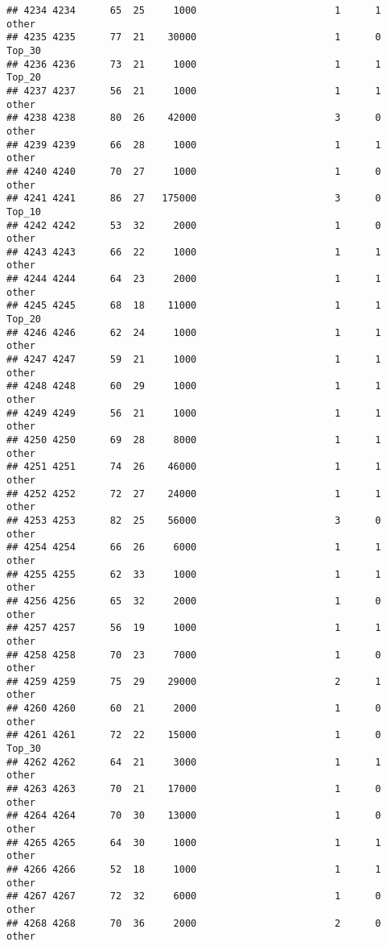 \documentclass[
]{article}
\begin{document}
\begin{verbatim}
## 4234 4234      65  25     1000                        1      1    other
## 4235 4235      77  21    30000                        1      0   Top_30
## 4236 4236      73  21     1000                        1      1   Top_20
## 4237 4237      56  21     1000                        1      1    other
## 4238 4238      80  26    42000                        3      0    other
## 4239 4239      66  28     1000                        1      1    other
## 4240 4240      70  27     1000                        1      0    other
## 4241 4241      86  27   175000                        3      0   Top_10
## 4242 4242      53  32     2000                        1      0    other
## 4243 4243      66  22     1000                        1      1    other
## 4244 4244      64  23     2000                        1      1    other
## 4245 4245      68  18    11000                        1      1   Top_20
## 4246 4246      62  24     1000                        1      1    other
## 4247 4247      59  21     1000                        1      1    other
## 4248 4248      60  29     1000                        1      1    other
## 4249 4249      56  21     1000                        1      1    other
## 4250 4250      69  28     8000                        1      1    other
## 4251 4251      74  26    46000                        1      1    other
## 4252 4252      72  27    24000                        1      1    other
## 4253 4253      82  25    56000                        3      0    other
## 4254 4254      66  26     6000                        1      1    other
## 4255 4255      62  33     1000                        1      1    other
## 4256 4256      65  32     2000                        1      0    other
## 4257 4257      56  19     1000                        1      1    other
## 4258 4258      70  23     7000                        1      0    other
## 4259 4259      75  29    29000                        2      1    other
## 4260 4260      60  21     2000                        1      0    other
## 4261 4261      72  22    15000                        1      0   Top_30
## 4262 4262      64  21     3000                        1      1    other
## 4263 4263      70  21    17000                        1      0    other
## 4264 4264      70  30    13000                        1      0    other
## 4265 4265      64  30     1000                        1      1    other
## 4266 4266      52  18     1000                        1      1    other
## 4267 4267      72  32     6000                        1      0    other
## 4268 4268      70  36     2000                        2      0    other

\end{verbatim}
\end{document}
